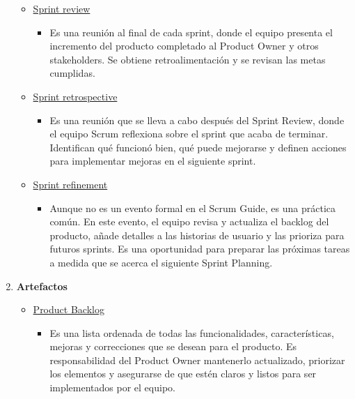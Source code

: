 \documentclass[12pt, letterpaper]{article}
\begin{document}
\begin{enumerate}
\begin{itemize}
            \item \underline{Sprint review}
                \begin{itemize}
                    \item Es una reunión al final de cada sprint, donde el equipo presenta el incremento del 
                    producto completado al Product Owner y otros stakeholders. Se obtiene retroalimentación y 
                    se revisan las metas cumplidas.
                \end{itemize}

            \item \underline{Sprint retrospective}
                \begin{itemize}
                    \item Es una reunión que se lleva a cabo después del Sprint Review, donde el equipo Scrum 
                    reflexiona sobre el sprint que acaba de terminar. Identifican qué funcionó bien, qué puede 
                    mejorarse y definen acciones para implementar mejoras en el siguiente sprint.
                \end{itemize}

            \item \underline{Sprint refinement}
                \begin{itemize}
                    \item Aunque no es un evento formal en el Scrum Guide, es una práctica común. En este 
                    evento, el equipo revisa y actualiza el backlog del producto, añade detalles a las 
                    historias de usuario y las prioriza para futuros sprints. Es una oportunidad para 
                    preparar las próximas tareas a medida que se acerca el siguiente Sprint Planning.
                \end{itemize}

        \end{itemize}
    
    \item \textbf{Artefactos}
        \begin{itemize}
            \item \underline{Product Backlog}
                \begin{itemize}
                    \item Es una lista ordenada de todas las funcionalidades, características, mejoras y 
                    correcciones que se desean para el producto. Es responsabilidad del Product Owner 
                    mantenerlo actualizado, priorizar los elementos y asegurarse de que estén claros y listos 
                    para ser implementados por el equipo.
                \end{itemize}


\end{itemize}
\end{enumerate}
\end{document}
